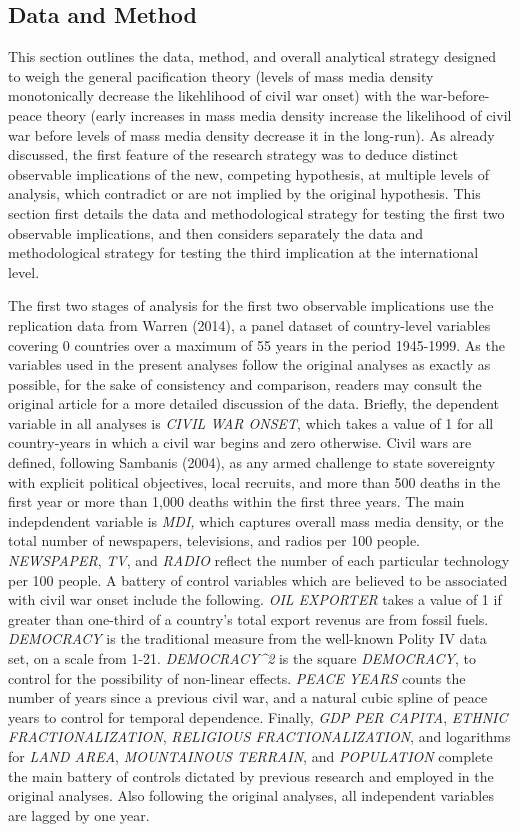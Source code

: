 \documentclass[11pt,article,oneside]{memoir}
\begin{document}
\subsection{Data and Method}\label{data-and-method}

This section outlines the data, method, and overall analytical strategy
designed to weigh the general pacification theory (levels of mass media
density monotonically decrease the likehlihood of civil war onset) with
the war-before-peace theory (early increases in mass media density
increase the likelihood of civil war before levels of mass media density
decrease it in the long-run). As already discussed, the first feature of
the research strategy was to deduce distinct observable implications of
the new, competing hypothesis, at multiple levels of analysis, which
contradict or are not implied by the original hypothesis. This section
first details the data and methodological strategy for testing the first
two observable implications, and then considers separately the data and
methodological strategy for testing the third implication at the
international level.

The first two stages of analysis for the first two observable
implications use the replication data from Warren (2014), a panel
dataset of country-level variables covering 0 countries over a maximum
of 55 years in the period 1945-1999. As the variables used in the
present analyses follow the original analyses as exactly as possible,
for the sake of consistency and comparison, readers may consult the
original article for a more detailed discussion of the data. Briefly,
the dependent variable in all analyses is \emph{CIVIL WAR ONSET}, which
takes a value of 1 for all country-years in which a civil war begins and
zero otherwise. Civil wars are defined, following Sambanis (2004), as
any armed challenge to state sovereignty with explicit political
objectives, local recruits, and more than 500 deaths in the first year
or more than 1,000 deaths within the first three years. The main
indepdendent variable is \emph{MDI,} which captures overall mass media
density, or the total number of newspapers, televisions, and radios per
100 people. \emph{NEWSPAPER}, \emph{TV}, and \emph{RADIO} reflect the
number of each particular technology per 100 people. A battery of
control variables which are believed to be associated with civil war
onset include the following. \emph{OIL EXPORTER} takes a value of 1 if
greater than one-third of a country's total export revenus are from
fossil fuels. \emph{DEMOCRACY} is the traditional measure from the
well-known Polity IV data set, on a scale from 1-21.
\emph{DEMOCRACY\^{}2} is the square \emph{DEMOCRACY}, to control for the
possibility of non-linear effects. \emph{PEACE YEARS} counts the number
of years since a previous civil war, and a natural cubic spline of peace
years to control for temporal dependence. Finally, \emph{GDP PER
CAPITA}, \emph{ETHNIC FRACTIONALIZATION}, \emph{RELIGIOUS
FRACTIONALIZATION}, and logarithms for \emph{LAND AREA},
\emph{MOUNTAINOUS TERRAIN}, and \emph{POPULATION} complete the main
battery of controls dictated by previous research and employed in the
original analyses. Also following the original analyses, all independent
variables are lagged by one year.
\end{document}
